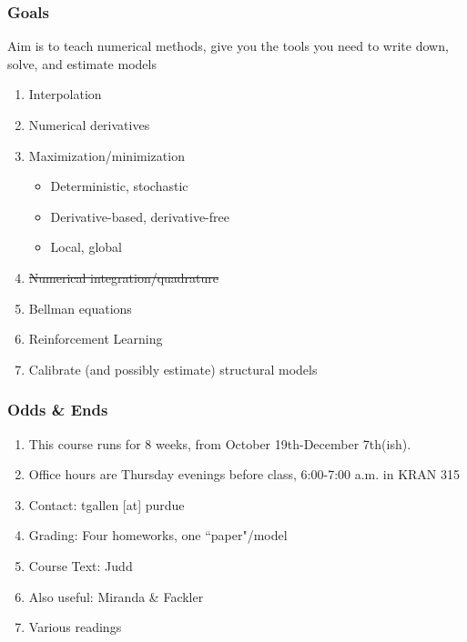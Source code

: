 \documentclass{beamer}
\author{Trevor Gallen}
\date{}
\begin{document}
\begin{frame}
\titlepage
\end{frame}

\begin{frame}
\frametitle[alignment=center]{Goals}
Aim is to teach numerical methods, give you the tools you need to write down, solve, and estimate models
\bigskip
\begin{enumerate}
\item Interpolation 
\bigskip
\item Numerical derivatives
\bigskip
\item Maximization/minimization 
\bigskip
\begin{itemize}
\item Deterministic, stochastic 
\bigskip
\item Derivative-based, derivative-free
\bigskip
\item Local, global
\bigskip
\end{itemize}
\item \sout{Numerical integration/quadrature}
\bigskip
\item Bellman equations 
\bigskip
\item  Reinforcement Learning
\bigskip
\item Calibrate (and possibly estimate) structural models 
\end{enumerate}
\end{frame}

\begin{frame}
\frametitle[alignment=center]{Odds \& Ends}
\begin{enumerate}
\item This course runs for 8 weeks, from October 19th-December 7th(ish).\\
\bigskip
\item Office hours are Thursday evenings before class, 6:00-7:00 a.m. in KRAN 315
\bigskip
\item Contact:  tgallen [at] purdue
\bigskip
\item Grading:  Four homeworks, one ``paper"/model
\bigskip
\item Course Text:  Judd
\bigskip
\item Also useful:  Miranda \& Fackler
\bigskip
\item Various readings
\end{enumerate}
\end{frame}
\end{document}
